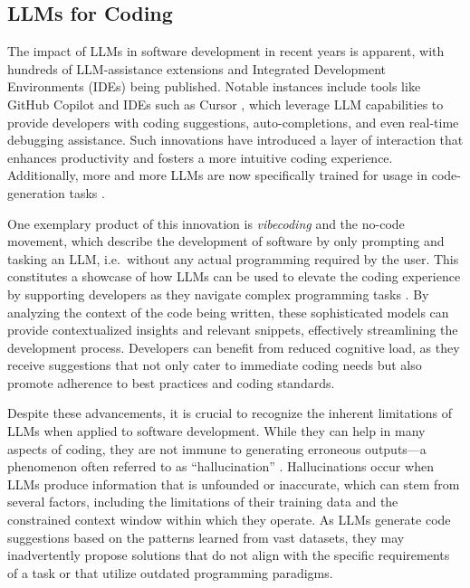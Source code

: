 \documentclass[
  a4paper,
]{scrreprt}
\theoremstyle{definition}
\theoremstyle{remark}
\begin{document}
\subsection{LLMs for Coding}\label{sec-llm-coding}

The impact of LLMs in software development in recent years is apparent,
with hundreds of LLM-assistance extensions and Integrated Development
Environments (IDEs) being published. Notable instances include tools
like GitHub Copilot and IDEs such as Cursor \autocite{cursor,ghcopilot},
which leverage LLM capabilities to provide developers with coding
suggestions, auto-completions, and even real-time debugging assistance.
Such innovations have introduced a layer of interaction that enhances
productivity and fosters a more intuitive coding experience.
Additionally, more and more LLMs are now specifically trained for usage
in code-generation tasks
\autocite{nijkamp2023a,nijkamp2023,openai2025a}.

One exemplary product of this innovation is \emph{vibecoding} and the
no-code movement, which describe the development of software by only
prompting and tasking an LLM, i.e.~without any actual programming
required by the user. This constitutes a showcase of how LLMs can be
used to elevate the coding experience by supporting developers as they
navigate complex programming tasks \autocite{sarkar2025}. By analyzing
the context of the code being written, these sophisticated models can
provide contextualized insights and relevant snippets, effectively
streamlining the development process. Developers can benefit from
reduced cognitive load, as they receive suggestions that not only cater
to immediate coding needs but also promote adherence to best practices
and coding standards.

Despite these advancements, it is crucial to recognize the inherent
limitations of LLMs when applied to software development. While they can
help in many aspects of coding, they are not immune to generating
erroneous outputs---a phenomenon often referred to as ``hallucination''
\autocite{huang2025}. Hallucinations occur when LLMs produce information
that is unfounded or inaccurate, which can stem from several factors,
including the limitations of their training data and the constrained
context window within which they operate. As LLMs generate code
suggestions based on the patterns learned from vast datasets, they may
inadvertently propose solutions that do not align with the specific
requirements of a task or that utilize outdated programming paradigms.
\end{document}
